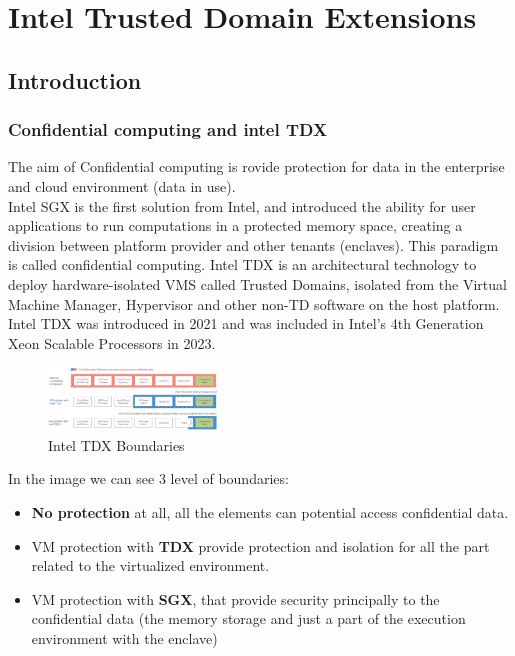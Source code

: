 \chapter{Intel Trusted Domain Extensions}

\section{Introduction}

\subsection{Confidential computing and intel TDX}

The aim of Confidential computing is rovide  protection for data in the enterprise and cloud environment (data in use). \\
Intel SGX is the first solution from Intel, and introduced the ability for user applications to run
computations in a protected memory space, creating a division between platform provider and other tenants (enclaves). This paradigm is called confidential computing.
Intel TDX is an architectural technology to deploy hardware-isolated VMS called Trusted Domains, isolated from the Virtual Machine Manager, Hypervisor and other non-TD software on the host platform. \\
Intel TDX was introduced in 2021 and was included in Intel's 4th Generation Xeon Scalable Processors in 2023.

\begin{figure}[H]
    \centering
    \includegraphics[width=0.4\textwidth]{img/tdx-boundaries.png}
    \caption{Intel TDX Boundaries}
    \label{fig:tdx boundaries}
\end{figure}

In the image we can see 3 level of boundaries:
\begin{itemize}
    \item \textbf{No protection} at all, all the elements can potential access confidential data.
    \item VM protection with \textbf{TDX} provide protection and isolation for all the part related to the virtualized environment.
    \item VM protection with \textbf{SGX}, that provide security principally to the confidential data (the memory storage and just a part of the execution environment with the enclave)
\end{itemize}

